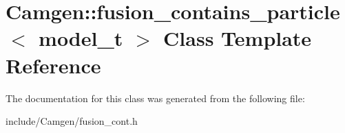 \hypertarget{a00235}{\section{Camgen\-:\-:fusion\-\_\-contains\-\_\-particle$<$ model\-\_\-t $>$ Class Template Reference}
\label{a00235}
}


The documentation for this class was generated from the following file\-:\begin{DoxyCompactItemize}
\item 
include/\-Camgen/fusion\-\_\-cont.\-h\end{DoxyCompactItemize}
